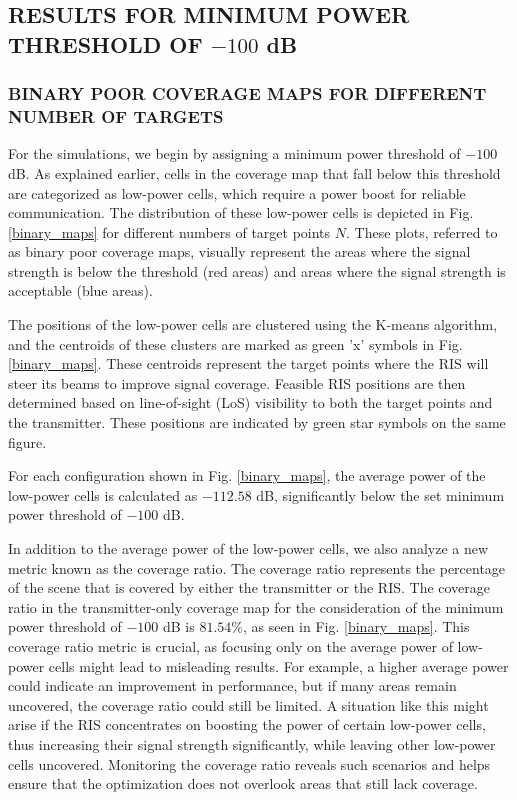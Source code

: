 \documentclass{IEEEoj}
\begin{document}
\subsection{RESULTS FOR MINIMUM POWER THRESHOLD OF $-100$ dB}

\subsubsection{BINARY POOR COVERAGE MAPS FOR DIFFERENT NUMBER OF TARGETS}
For the simulations, we begin by assigning a minimum power threshold of $-100$ dB. As explained earlier, cells in the coverage map that fall below this threshold are categorized as low-power cells, which require a power boost for reliable communication. The distribution of these low-power cells is depicted in Fig. \ref{binary_maps} for different numbers of target points $N$. These plots, referred to as binary poor coverage maps, visually represent the areas where the signal strength is below the threshold (red areas) and areas where the signal strength is acceptable (blue areas).

The positions of the low-power cells are clustered using the K-means algorithm, and the centroids of these clusters are marked as green 'x' symbols in Fig. \ref{binary_maps}. These centroids represent the target points where the RIS will steer its beams to improve signal coverage. Feasible RIS positions are then determined based on line-of-sight (LoS) visibility to both the target points and the transmitter. These positions are indicated by green star symbols on the same figure.

For each configuration shown in Fig. \ref{binary_maps}, the average power of the low-power cells is calculated as $-112.58$ dB, significantly below the set minimum power threshold of $-100$ dB.

In addition to the average power of the low-power cells, we also analyze a new metric known as the coverage ratio. The coverage ratio represents the percentage of the scene that is covered by either the transmitter or the RIS. The coverage ratio in the transmitter-only coverage map for the consideration of the minimum power threshold of $-100$ dB is $81.54\%$, as seen in Fig. \ref{binary_maps}. This coverage ratio metric is crucial, as focusing only on the average power of low-power cells might lead to misleading results. For example, a higher average power could indicate an improvement in performance, but if many areas remain uncovered, the coverage ratio could still be limited. A situation like this might arise if the RIS concentrates on boosting the power of certain low-power cells, thus increasing their signal strength significantly, while leaving other low-power cells uncovered. Monitoring the coverage ratio reveals such scenarios and helps ensure that the optimization does not overlook areas that still lack coverage.
\end{document}
